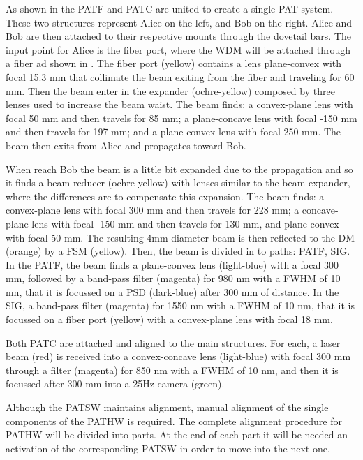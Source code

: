 
As shown in the  PATF and PATC are united to create a single PAT system. These two structures represent Alice on the left, and Bob on the right. Alice and Bob are then attached to their respective mounts through the dovetail bars.
The input point for Alice is the fiber port, where the WDM will be attached through a fiber ad shown in . The fiber port (yellow) contains a lens plane-convex with focal 15.3 mm that collimate the beam exiting from the fiber and traveling for 60 mm. Then the beam enter in the expander (ochre-yellow) composed by three lenses used to increase the beam waist. The beam finds: a convex-plane lens with focal 50 mm and then travels for 85 mm; a plane-concave lens with focal -150 mm and then travels for 197 mm; and a plane-convex lens with focal 250 mm. The beam then exits from Alice and propagates toward Bob.

When reach Bob the beam is a little bit expanded due to the propagation and so it finds a beam reducer (ochre-yellow) with lenses similar to the beam expander, where the differences are to compensate this expansion. The beam finds: a convex-plane lens with focal 300 mm and then travels for 228 mm; a concave-plane lens with focal -150 mm and then travels for 130 mm, and plane-convex with focal 50 mm. The resulting 4mm-diameter beam is then reflected to the DM (orange) by a FSM (yellow). Then, the beam is divided in to paths: PATF, SIG.
In the PATF, the beam finds a plane-convex lens (light-blue) with a focal 300 mm, followed by a band-pass filter (magenta) for 980 nm with a FWHM of 10 nm, that it is focussed on a PSD (dark-blue) after 300 mm of distance.
In the SIG, a band-pass filter (magenta) for 1550 nm with a FWHM of 10 nm, that it is focussed on a fiber port (yellow) with a convex-plane lens with focal 18 mm.

Both PATC are attached and aligned to the main structures. For each, a laser beam (red) is received into a convex-concave lens (light-blue) with focal 300 mm through a filter (magenta) for 850 nm with a FWHM of 10 nm, and then it is focussed after 300 mm into a 25Hz-camera (green).

Although the PATSW maintains alignment, manual alignment of the single components of the PATHW is required.
The complete alignment procedure for PATHW will be divided into parts. At the end of each part it will be needed an activation of the corresponding PATSW in order to move into the next one.

